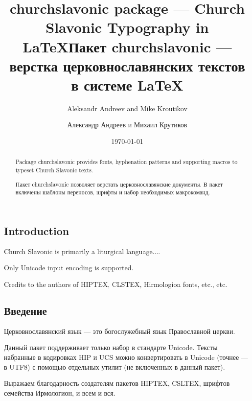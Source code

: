\usepackage{churchslavonic}
\usepackage{hyperref}



\begin{EN}
\title{\textsf{churchslavonic} package --- Church Slavonic Typography in \LaTeX}
\author{Aleksandr Andreev and Mike Kroutikov}
\end{EN}

\begin{RU}
\title{Пакет \textsf{churchslavonic} --- верстка церковнославянских текстов в системе \LaTeX}
\author{Александр Андреев и Михаил Крутиков}
\end{RU}

\date{\today}
\maketitle

\begin{EN}
\begin{abstract}
Package \textsf{churchslavonic} provides fonts, hyphenation patterns and supporting macros to typeset
Church Slavonic texts.
\end{abstract}
\end{EN}

\begin{RU}
\begin{abstract}
Пакет \textsf{churchslavonic} позволяет верстать церковнославянские документы. В пакет включены шаблоны переносов,
шрифты и набор необходимых макрокоманд.
\end{abstract}
\end{RU}

\tableofcontents

\begin{EN}
\section{Introduction}
Church Slavonic is primarily a liturgical language....

Only Unicode input encoding is supported.

Credits to the authors of HIPTEX, CLSTEX, Hirmologion fonts, etc., etc. 
\end{EN}

\begin{RU}
\section{Введение}
Церковнославянский язык --- это богослужебный язык Православной церкви.

Данный пакет поддерживает только набор в стандарте Unicode. Тексты набранные в кодировках HIP и UCS
можно конвертировать в Unicode (точнее --- в UTF8) с помощью отдельных утилит (не включенных в данный пакет).

Выражаем благодарность создателям пакетов HIPTEX, CSLTEX, шрифтов семейства Ирмологион, и всем и вся.
\end{RU}


